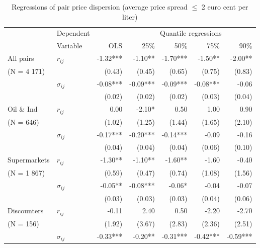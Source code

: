 \documentclass[english]{article}
\begin{document}
\begin{table}%
\caption{Regressions of pair price dispersion (average price spread $\le$ 2 euro cent per liter)}
\label{tab:regs_pairs}
\begin{threeparttable}
    \begin{tabular}{rrrrrrr}
    \toprule
    \toprule
          & \multicolumn{1}{l}{Dependent} &       & \multicolumn{4}{c}{Quantile regressions} \\
          & \multicolumn{1}{l}{Variable} & OLS   & 25\%  & 50\%  & 75\%  & 90\% \\
    \midrule
    \multicolumn{1}{l}{All pairs} & \multicolumn{1}{l}{$r_{ij}$} & -1.32*** & -1.10** & -1.70*** & -1.50** & -2.00** \\
    \multicolumn{1}{l}{(N =  4 171)} &       & (0.43) & (0.45) & (0.65) & (0.75) & (0.83) \\
          & \multicolumn{1}{l}{$\sigma_{ij}$} & -0.08*** & -0.09*** & -0.09*** & -0.08*** & -0.06 \\
          &       & (0.02) & (0.02) & (0.02) & (0.03) & (0.04) \\
    \midrule
    \multicolumn{1}{l}{Oil \& Ind} & \multicolumn{1}{l}{$r_{ij}$} & 0.00  & -2.10* & 0.50  & 1.00  & 0.90 \\
    \multicolumn{1}{l}{ (N = 646)} &       & (1.02) & (1.25) & (1.44) & (1.65) & (2.10) \\
          & \multicolumn{1}{l}{$\sigma_{ij}$} & -0.17*** & -0.20*** & -0.14*** & -0.09 & -0.16 \\
          &       & (0.04) & (0.04) & (0.04) & (0.06) & (0.10) \\
    \midrule
    \multicolumn{1}{l}{Supermarkets} & \multicolumn{1}{l}{$r_{ij}$} & -1.30** & -1.10** & -1.60** & -1.60 & -0.40 \\
    \multicolumn{1}{l}{ (N = 1 867)} &       & (0.59) & (0.47) & (0.74) & (1.08) & (1.56) \\
          & \multicolumn{1}{l}{$\sigma_{ij}$} & -0.05** & -0.08*** & -0.06* & -0.04 & -0.07 \\
          &       & (0.03) & (0.03) & (0.03) & (0.04) & (0.06) \\
    \midrule
    \multicolumn{1}{l}{Discounters} & \multicolumn{1}{l}{$r_{ij}$} & -0.11 & 2.40  & 0.50  & -2.20 & -2.70 \\
    \multicolumn{1}{l}{ (N = 156)} &       & (1.92) & (3.67) & (2.83) & (2.36) & (2.51) \\
          & \multicolumn{1}{l}{$\sigma_{ij}$} & -0.33*** & -0.20** & -0.31*** & -0.42*** & -0.59*** \\

\end{tabular}
\end{threeparttable}
\end{table}
\end{document}
